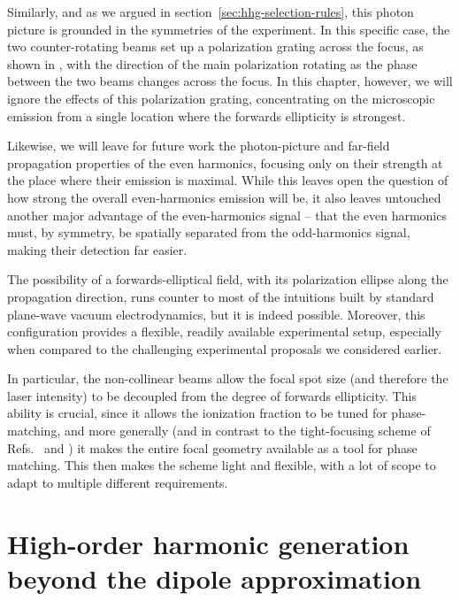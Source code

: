Similarly, and as we argued in section~\ref{sec:hhg-selection-rules}, this photon picture is grounded in the symmetries of the experiment. In this specific case, the two counter-rotating beams set up a polarization grating across the focus, as shown in , with the direction of the main polarization rotating as the phase between the two beams changes across the focus. In this chapter, however, we will ignore the effects of this polarization grating, concentrating on the microscopic emission from a single location where the forwards ellipticity is strongest. 

Likewise, we will leave for future work the photon-picture and far-field propagation properties of the even harmonics, focusing only on their strength at the place where their emission is maximal. While this leaves open the question of how strong the overall even-harmonics emission will be, it also leaves untouched another major advantage of the even-harmonics signal -- that the even harmonics must, by symmetry, be spatially separated from the odd-harmonics signal, making their detection far easier.



The possibility of a forwards-elliptical field, with its polarization ellipse along the propagation direction, runs counter to most of the intuitions built by standard plane-wave vacuum electrodynamics, but it is indeed possible. Moreover, this configuration provides a flexible, readily available experimental setup, especially when compared to the challenging experimental proposals we considered earlier. 

In particular, the non-collinear beams allow the focal spot size (and therefore the laser intensity) to be decoupled from the degree of forwards ellipticity. This ability is crucial, since it allows the ionization fraction to be tuned for phase-matching, and more generally (and in contrast to the tight-focusing scheme of Refs.~\citealp{galloway_lorentz_2016} and \citealp{lin_tight-focus_2006}) it makes the entire focal geometry available as a tool for phase matching. This then makes the scheme light and flexible, with a lot of scope to adapt to multiple different requirements.




\section{High-order harmonic generation beyond the dipole approximation}

